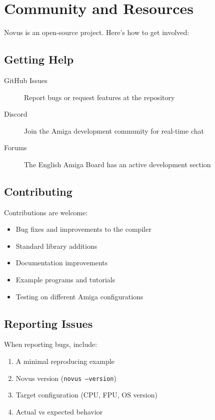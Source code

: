 \section{Community and Resources}
\label{sec:community}

Novus is an open-source project. Here's how to get involved:

\subsection{Getting Help}

\begin{description}
    \item[GitHub Issues] Report bugs or request features at the repository
    \item[Discord] Join the Amiga development community for real-time chat
    \item[Forums] The English Amiga Board has an active development section
\end{description}

\subsection{Contributing}

Contributions are welcome:

\begin{itemize}
    \item Bug fixes and improvements to the compiler
    \item Standard library additions
    \item Documentation improvements
    \item Example programs and tutorials
    \item Testing on different Amiga configurations
\end{itemize}

\subsection{Reporting Issues}

When reporting bugs, include:

\begin{enumerate}
    \item A minimal reproducing example
    \item Novus version (\texttt{novus --version})
    \item Target configuration (CPU, FPU, OS version)
    \item Actual vs expected behavior
\end{enumerate}

